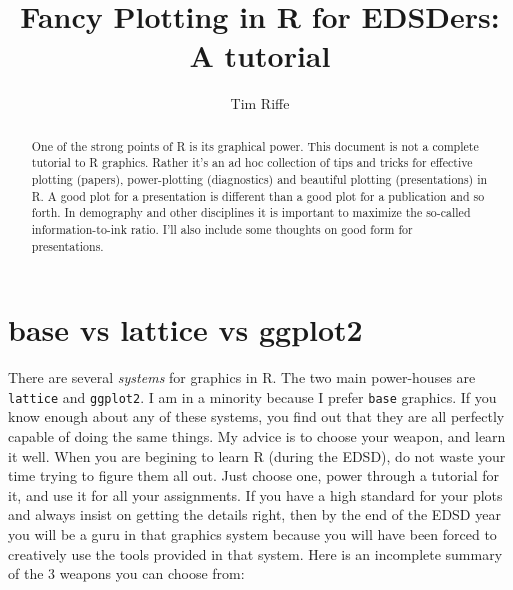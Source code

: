 \documentclass[a4paper]{article}
\begin{document}
\title{Fancy Plotting in R for EDSDers: A tutorial}
\author{Tim Riffe}

\maketitle

\begin{abstract}
One of the strong points of R is its graphical power. This document is not a complete tutorial to R graphics. Rather it's an ad hoc collection of tips and tricks for effective plotting (papers), power-plotting (diagnostics) and beautiful plotting (presentations) in R. A good plot for a presentation is different than a good plot for a publication and so forth. In demography and other disciplines it is important to maximize the so-called information-to-ink ratio. I'll also include some thoughts on good form for presentations.
\end{abstract}

\pagebreak
\section{base vs lattice vs ggplot2}
There are several \textit{systems} for graphics in R. The two main power-houses are \texttt{lattice} and \texttt{ggplot2}. I am in a minority because I prefer \texttt{base} graphics. If you know enough about any of these systems, you find out that they are all perfectly capable of doing the same things. My advice is to choose your weapon, and learn it well. When you are begining to learn R (during the EDSD), do not waste your time trying to figure them all out. Just choose one,  power through a tutorial for it, and use it for all your assignments. If you have a high standard for your plots and always insist on getting the details right, then by the end of the EDSD year you will be a guru in that graphics system because you will have been forced to creatively use the tools provided in that system. Here is an incomplete summary of the 3 weapons you can choose from:
\end{document}
